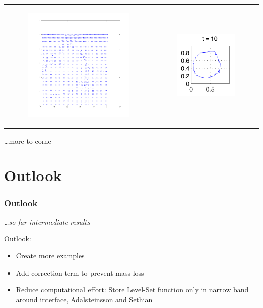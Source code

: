 \documentclass[ucs]{beamer}
\begin{document}
\begin{frame}
\begin{tabular}{l l}
\begin{minipage}{0.5\textwidth}
\begin{figure}[h!]
\includegraphics[width=7cm]{plots/vel10.png}
\end{figure}
\end{minipage}
&
\begin{minipage}{0.5\textwidth}
\begin{figure}[h!]
  \includegraphics[width=4cm]{plots/interface_t10.png}
\end{figure}
\end{minipage}
\end{tabular}
\dots more to come 
\end{frame}

\section{Outlook}
\begin{frame}
\frametitle{Outlook}
\textit{\dots so far intermediate results}

\vspace{.8cm} 
Outlook:
\begin{itemize}
\item<1-> Create more examples
\item<2-> Add correction term to prevent mass loss
\item<3-> Reduce computational effort: Store Level-Set function only in narrow band around interface, Adalsteinsson and Sethian
\end{itemize}

\end{frame}
\end{document}
